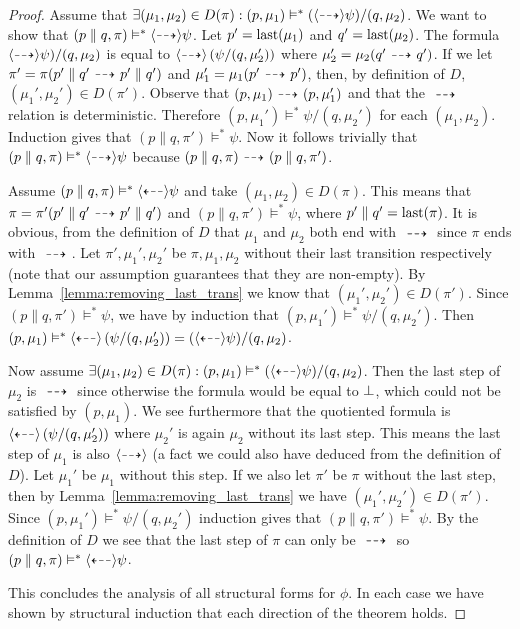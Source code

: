 \begin{proof}
    \rtl Assume that $\exists (\mu_1,\mu_2) \in D(\pi) : (p,\mu_1) \vDash^* (\mbox{\ensuremath{\langle\stackrel{_{}}{\dashrightarrow}\rangle}}
    \psi)/(q,\mu_2)$. 
    We want to show that $(p\parallel q,\pi) \vDash^* \mbox{\ensuremath{\langle\stackrel{_{}}{\dashrightarrow}\rangle}}\psi$.
    Let $p' = \operatorname{last}(\mu_1)$ and $q' = \operatorname{last}(\mu_2)$.
    The formula $\mbox{\ensuremath{\langle\stackrel{_{}}{\dashrightarrow}\rangle}} \psi)/(q,\mu_2)$ is equal to 
    $\mbox{\ensuremath{\langle\stackrel{_{}}{\dashrightarrow}\rangle}} \left( \psi / (q,\mu_2') \right)$
    where $\mu_2' = \mu_2(q' \ {\stackrel{_{}}{\dashrightarrow}}\  q')$. If we let $\pi' = \pi
    (p'\parallel q' \ {\stackrel{_{}}{\dashrightarrow}}\  p'\parallel q')$ and $\mu_1' = \mu_1(p'\ {\stackrel{_{}}{\dashrightarrow}}\  p')$,
    then, by definition of $D$, $(\mu_1',\mu_2') \in D(\pi')$.
    Observe that $(p,\mu_1)\ {\stackrel{_{}}{\dashrightarrow}}\ (p,\mu_1')$ and that the $\ {\stackrel{_{}}{\dashrightarrow}}\ $ relation
    is deterministic. Therefore
    $(p,\mu_1')\vDash^* \psi/(q,\mu_2')$ for each $(\mu_1,\mu_2)$. 
    Induction gives that $(p\parallel q, \pi')
    \vDash^* \psi$. Now it follows trivially that $(p\parallel q,\pi) \vDash^* \mbox{\ensuremath{\langle\stackrel{_{}}{\dashrightarrow}\rangle}}
    \psi$ because $(p\parallel q, \pi)\ {\stackrel{_{}}{\dashrightarrow}}\ (p\parallel q, \pi')$.


    \par\nobreak
    \ltr Assume $(p\parallel q, \pi) \vDash^* \mbox{\ensuremath{\langle\stackrel{_{}}{\dashleftarrow}\rangle}}\psi$ and take $(\mu_1,\mu_2)
    \in D(\pi)$. 
    This means that $\pi = \pi'(p'\parallel q' \ {\stackrel{_{}}{\dashrightarrow}}\  p'\parallel q')$ and
    $(p\parallel q,\pi')\vDash^*\psi$, where $p'\parallel q' = \operatorname{last}(\pi)$.
    It is obvious, from the definition of $D$ that $\mu_1$ and $\mu_2$ both
    end with $\ {\stackrel{_{}}{\dashrightarrow}}\ $ since $\pi$ ends with $\ {\stackrel{_{}}{\dashrightarrow}}\ $. Let $\pi', \mu_1', \mu_2'$
    be $\pi,\mu_1,\mu_2$ without their last transition respectively (note that our assumption
    guarantees that they are non-empty). By Lemma~\ref{lemma:removing_last_trans} we know
    that $(\mu_1',\mu_2') \in D(\pi')$. Since $(p\parallel q,\pi') \vDash^* \psi$, we have
    by induction that $(p,\mu_1')\vDash^* \psi/(q,\mu_2')$. Then $(p,\mu_1)\vDash^*
    \mbox{\ensuremath{\langle\stackrel{_{}}{\dashleftarrow}\rangle}} \left( \psi/(q,\mu_2') \right) = (\mbox{\ensuremath{\langle\stackrel{_{}}{\dashleftarrow}\rangle}}\psi)/(q,\mu_2)$.

    \rtl Now assume $\exists (\mu_1,\mu_2) \in D(\pi) : (p,\mu_1) \vDash^* (\mbox{\ensuremath{\langle\stackrel{_{}}{\dashleftarrow}\rangle}}
    \psi)/(q,\mu_2)$. Then the last step of $\mu_2$ is $\ {\stackrel{_{}}{\dashrightarrow}}\ $ since otherwise
    the formula would be equal to $\bot$, which could not be satisfied by $(p,\mu_1)$.
    We see furthermore that the quotiented formula is $\mbox{\ensuremath{\langle\stackrel{_{}}{\dashleftarrow}\rangle}}\left(\psi/(q,\mu_2')\right)$ where
    $\mu_2'$ is again $\mu_2$ without its last step. This means the last step of $\mu_1$
    is also $\mbox{\ensuremath{\langle\stackrel{_{}}{\dashrightarrow}\rangle}}$ (a fact we could also have deduced from the definition of $D$).
    Let $\mu_1'$ be $\mu_1$ without this step. If we also let $\pi'$ be $\pi$ without the
    last step, then by Lemma~\ref{lemma:removing_last_trans} we have
    $(\mu_1',\mu_2')\in D(\pi')$. Since
    $(p,\mu_1')\vDash^* \psi/(q,\mu_2')$ induction gives that $(p\parallel q,\pi')\vDash^*
    \psi$. By the definition of $D$ we see that the last step of $\pi$ can only be $\ {\stackrel{_{}}{\dashrightarrow}}\ $
    so $(p\parallel q, \pi)\vDash^* \mbox{\ensuremath{\langle\stackrel{_{}}{\dashleftarrow}\rangle}} \psi$.

    \vspace{1em}

    This concludes the analysis of all structural forms for $\phi$. In each case we have
    shown by structural induction that each direction of the theorem holds.
\end{proof}

